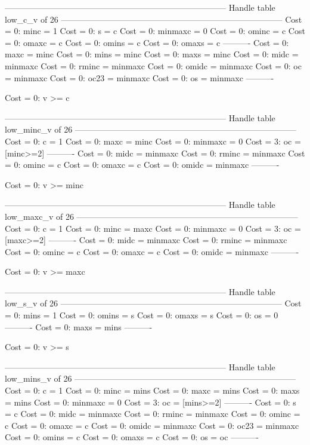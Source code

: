 --------------------------------------------------------------------------------
Handle table low_c_v of 26
--------------------------------------------------------------------------------
Cost =  0:  minc    = 1
Cost =  0:  s       = c
Cost =  0:  minmaxc = 0
Cost =  0:  ominc   = c
Cost =  0:  omaxc   = c
Cost =  0:  omins   = c
Cost =  0:  omaxs   = c
----------
Cost =  0:  maxc    = minc
Cost =  0:  mins    = minc
Cost =  0:  maxs    = minc
Cost =  0:  midc    = minmaxc
Cost =  0:  rminc   = minmaxc
Cost =  0:  omidc   = minmaxc
Cost =  0:  oc      = minmaxc
Cost =  0:  oc23    = minmaxc
Cost =  0:  os      = minmaxc
----------

Cost =  0:  v >= c

--------------------------------------------------------------------------------
Handle table low_minc_v of 26
--------------------------------------------------------------------------------
Cost =  0:  c       = 1
Cost =  0:  maxc    = minc
Cost =  0:  minmaxc = 0
Cost =  3:  oc      = [minc>=2]
----------
Cost =  0:  midc    = minmaxc
Cost =  0:  rminc   = minmaxc
Cost =  0:  ominc   = c
Cost =  0:  omaxc   = c
Cost =  0:  omidc   = minmaxc
----------

Cost =  0:  v >= minc

--------------------------------------------------------------------------------
Handle table low_maxc_v of 26
--------------------------------------------------------------------------------
Cost =  0:  c       = 1
Cost =  0:  minc    = maxc
Cost =  0:  minmaxc = 0
Cost =  3:  oc      = [maxc>=2]
----------
Cost =  0:  midc    = minmaxc
Cost =  0:  rminc   = minmaxc
Cost =  0:  ominc   = c
Cost =  0:  omaxc   = c
Cost =  0:  omidc   = minmaxc
----------

Cost =  0:  v >= maxc

--------------------------------------------------------------------------------
Handle table low_s_v of 26
--------------------------------------------------------------------------------
Cost =  0:  mins  = 1
Cost =  0:  omins = s
Cost =  0:  omaxs = s
Cost =  0:  os    = 0
----------
Cost =  0:  maxs  = mins
----------

Cost =  0:  v >= s

--------------------------------------------------------------------------------
Handle table low_mins_v of 26
--------------------------------------------------------------------------------
Cost =  0:  c       = 1
Cost =  0:  minc    = mins
Cost =  0:  maxc    = mins
Cost =  0:  maxs    = mins
Cost =  0:  minmaxc = 0
Cost =  3:  oc      = [mins>=2]
----------
Cost =  0:  s       = c
Cost =  0:  midc    = minmaxc
Cost =  0:  rminc   = minmaxc
Cost =  0:  ominc   = c
Cost =  0:  omaxc   = c
Cost =  0:  omidc   = minmaxc
Cost =  0:  oc23    = minmaxc
Cost =  0:  omins   = c
Cost =  0:  omaxs   = c
Cost =  0:  os      = oc
----------

